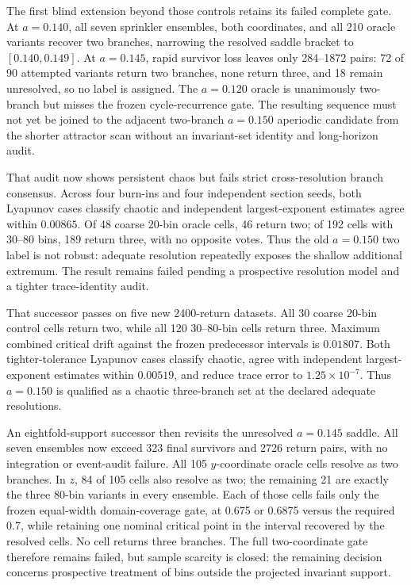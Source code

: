 The first blind extension beyond those controls retains its failed complete
gate.  At $a=0.140$, all seven sprinkler ensembles, both coordinates, and all
210 oracle variants recover two branches, narrowing the resolved saddle
bracket to $[0.140,0.149]$.  At $a=0.145$, rapid survivor loss leaves only
284--1872 pairs: 72 of 90 attempted variants return two branches, none return
three, and 18 remain unresolved, so no label is assigned.  The $a=0.120$
oracle is unanimously two-branch but misses the frozen cycle-recurrence gate.
The resulting sequence must not yet be joined to the adjacent two-branch
$a=0.150$ aperiodic candidate from the shorter attractor scan without an
invariant-set identity and long-horizon audit.

That audit now shows persistent chaos but fails strict cross-resolution branch
consensus.  Across four burn-ins and four independent section seeds, both
Lyapunov cases classify chaotic and independent largest-exponent estimates
agree within $0.00865$.  Of 48 coarse 20-bin oracle cells, 46 return two; of
192 cells with 30--80 bins, 189 return three, with no opposite votes.  Thus the
old $a=0.150$ two label is not robust: adequate resolution repeatedly exposes
the shallow additional extremum.  The result remains failed pending a
prospective resolution model and a tighter trace-identity audit.

That successor passes on five new 2400-return datasets.  All 30 coarse 20-bin
control cells return two, while all 120 30--80-bin cells return three.  Maximum
combined critical drift against the frozen predecessor intervals is $0.01807$.
Both tighter-tolerance Lyapunov cases classify chaotic, agree with independent
largest-exponent estimates within $0.00519$, and reduce trace error to
$1.25\times10^{-7}$.  Thus $a=0.150$ is qualified as a chaotic three-branch set
at the declared adequate resolutions.

An eightfold-support successor then revisits the unresolved $a=0.145$ saddle.
All seven ensembles now exceed 323 final survivors and 2726 return pairs, with
no integration or event-audit failure.  All 105 $y$-coordinate oracle cells
resolve as two branches.  In $z$, 84 of 105 cells also resolve as two; the
remaining 21 are exactly the three 80-bin variants in every ensemble.  Each of
those cells fails only the frozen equal-width domain-coverage gate, at 0.675 or
0.6875 versus the required 0.7, while retaining one nominal critical point in
the interval recovered by the resolved cells.  No cell returns three branches.
The full two-coordinate gate therefore remains failed, but sample scarcity is
closed: the remaining decision concerns prospective treatment of bins outside
the projected invariant support.

